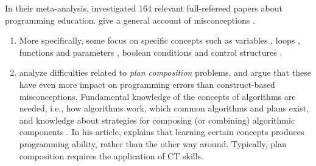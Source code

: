 In their meta-analysis,  investigated 164 relevant full-refereed papers about programming education. \citeauthor{robins2003learning} give a general account of misconceptions \cite{robins2003learning}.

\begin{enumerate}
\item  More specifically, some focus on specific concepts such as variables \cite{Kuittinen2004}, loops \cite{Dancik2003}, functions and parameters \cite{sorva2012misconceptions}, boolean conditions and control structures \cite{Almstrum1999}.

\item {} analyze difficulties related to \emph{plan composition} problems, and argue that these have even more impact on programming errors than construct-based misconceptions. Fundamental knowledge of the concepts of algorithms are needed, i.e., how algorithms work, which common algorithms and plans exist, and knowledge about strategies for composing (or combining) algorithmic components \cite{deRaadt2008}. In his article,  explains that learning certain concepts produces programming ability, rather than the other way around. Typically, plan composition requires the application of CT skills.


\end{enumerate}




